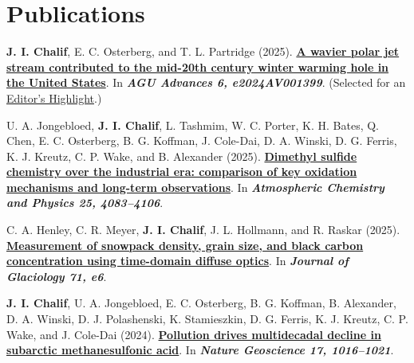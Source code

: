 \documentclass[a4paper,11pt]{article}
\begin{document}
\section{\textbf{Publications}}
\begin{enumerate}[leftmargin=*, labelsep=0.5em, align=left, widest={[\textbf{S.1}]}, itemindent=0em, label={\textbf{[\arabic*]}]}]

\item[\textbf{4}] \textbf{J. I. Chalif}, E. C. Osterberg, and T. L. Partridge (2025). \href{https://doi.org/10.1029/2024AV001399}{\textbf{A wavier polar jet stream contributed to the mid-20th century winter warming hole in the United States}}. In \textit{\textbf{AGU Advances 6, e2024AV001399}}. (Selected for an \href{https://eos.org/editor-highlights/the-mid-20th-century-winter-cooling-in-the-eastern-u-s-explained}{Editor's Highlight}.)

\item[\textbf{3}] U. A. Jongebloed, \textbf{J. I. Chalif}, L. Tashmim, W. C. Porter, K. H. Bates, Q. Chen, E. C. Osterberg, B. G. Koffman, J. Cole-Dai, D. A. Winski, D. G. Ferris, K. J. Kreutz, C. P. Wake, and B. Alexander (2025). \href{https://doi.org/10.5194/acp-25-4083-2025}{\textbf{Dimethyl sulfide chemistry over the industrial era: comparison of key oxidation mechanisms and long-term observations}}. In \textit{\textbf{Atmospheric Chemistry and Physics 25, 4083--4106}}.

\item[\textbf{2}] C. A. Henley, C. R. Meyer, \textbf{J. I. Chalif}, J. L. Hollmann, and R. Raskar (2025). \href{https://doi.org/10.1017/jog.2024.81}{\textbf{Measurement of snowpack density, grain size, and black carbon concentration using time-domain diffuse optics}}. In \textit{\textbf{Journal of Glaciology 71, e6}}.

\item[\textbf{1}] \textbf{J. I. Chalif}, U. A. Jongebloed, E. C. Osterberg, B. G. Koffman, B. Alexander, D. A. Winski, D. J. Polashenski, K. Stamieszkin, D. G. Ferris, K. J. Kreutz, C. P. Wake, and J. Cole-Dai (2024). \href{https://doi.org/10.1038/s41561-024-01543-w}{\textbf{Pollution drives multidecadal decline in subarctic methanesulfonic acid}}. In \textit{\textbf{Nature Geoscience 17, 1016--1021}}.

\end{enumerate}
\end{document}
